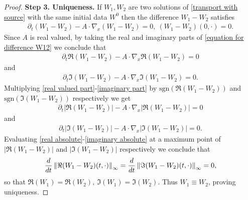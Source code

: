\documentclass[10pt,a4paper]{amsart}
\def\dd{{\rm d}}
\begin{document}
\begin{proof}
\textbf{Step 3. Uniqueness.} If $W_{1},W_{2}$ are two solutions of \eqref{transport with source} with the same initial data $W^{0}$ then the difference $W_{1}-W_{2}$ satisfies  \begin{align}
\partial_{t}(W_
{1}-W_{2})-A\cdot \nabla_{x}(W_{1}-W_{2})=0, \ (W_{1}-W_{2})(0,\cdot)=0. \label{equation for difference W12}    
\end{align}
Since $A$ is real valued, by taking the real and imaginary parts of  \eqref{equation for difference W12} we conclude that 
\begin{align}
\partial_{t}\Re(W_{1}-W_{2})-A\cdot \nabla_{x}\Re(W_{1}-W_{2})=0 \label{real valued part} 
\end{align}
and 
\begin{align}
\partial_{t}\Im(W_{1}-W_{2})-A\cdot  \nabla_{x}\Im(W_{1}-W_{2})=0.\label{imaginary part}     
\end{align}
Multiplying \eqref{real valued part}-\eqref{imaginary part} by $\mathrm{sgn}(\Re(W_{1}-W_{2}))$ and $\mathrm{sgn}(\Im(W_{1}-W_{2}))$ respectively we get 
\begin{align}
\partial_{t}\left\vert \Re(W_{1}-W_{2})\right\vert -A\cdot \nabla_{x}\left\vert \Re(W_{1}-W_{2})  \right\vert=0 
\label{real absolute}
\end{align}
and 
\begin{align}
\partial_{t}\left\vert \Im(W_{1}-W_{2})\right\vert-A\cdot \nabla_{x}\left\vert \Im(W_{1}-W_{2})\right\vert=0. \label{imaginary absolute}      
\end{align}
Evaluating \eqref{real absolute}-\eqref{imaginary absolute} at a maximum point of $\left\vert \Re(W_{1}-W_{2})\right\vert$ and $\left\vert \Im(W_{1}-W_{2})\right\vert$ respectively we conclude that 
\begin{align*}
\frac{\dd}{\dd t}\left\Vert \Re(W_{1}-W_{2})(t,\cdot)\right\Vert_{\infty}=\frac{\dd}{\dd t}\left\Vert \Im(W_{1}-W_{2})(t,\cdot)\right\Vert_{\infty}=0,     
\end{align*}
so that $\Re(W_{1})=\Re(W_{2}), \ \Im(W_{1})=\Im(W_{2})$. Thus $W_{1}\equiv W_{2}$, proving uniqueness. 
\end{proof}
\end{document}
